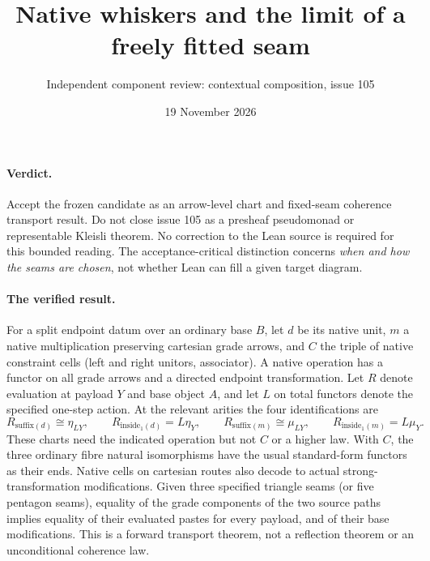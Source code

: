 \documentclass[11pt]{article}
\title{Native whiskers and the limit of a freely fitted seam}
\author{Independent component review: contextual composition, issue 105}
\date{19 November 2026}
\begin{document}
\maketitle
\paragraph{Verdict.}
Accept the frozen candidate as an arrow-level chart and fixed-seam coherence
transport result. Do not close issue 105 as a presheaf pseudomonad or
representable Kleisli theorem. No correction to the Lean source is required for
this bounded reading. The acceptance-critical distinction concerns \emph{when and
how the seams are chosen}, not whether Lean can fill a given target diagram.
\paragraph{The verified result.}
For a split endpoint datum over an ordinary base $B$, let $d$ be its native unit,
$m$ a native multiplication preserving cartesian grade arrows, and $C$ the
triple of native constraint cells (left and right unitors, associator).
A native operation has a functor on all grade arrows and a directed endpoint
transformation. Let $R$ denote evaluation at payload $Y$ and base object $A$,
and let $L$ on total functors denote the specified one-step action. At the
relevant arities the four identifications are
\[
 R_{\mathrm{suffix}(d)}\cong\eta_{LY},\qquad
 R_{\mathrm{inside}_1(d)}=L\eta_Y,\qquad
 R_{\mathrm{suffix}(m)}\cong\mu_{LY},\qquad
 R_{\mathrm{inside}_1(m)}=L\mu_Y .
\]
These charts need the indicated operation but not $C$ or a higher law.
With $C$, the three ordinary fibre natural isomorphisms have the usual
standard-form functors as their ends. Native cells on cartesian routes
also decode to actual strong-transformation modifications. Given three
specified triangle seams (or five pentagon seams), equality of the grade
components of the two source paths implies equality of their evaluated
pastes for every payload, and of their base modifications. This is a forward
transport theorem, not a reflection theorem or an unconditional coherence law.
\end{document}
